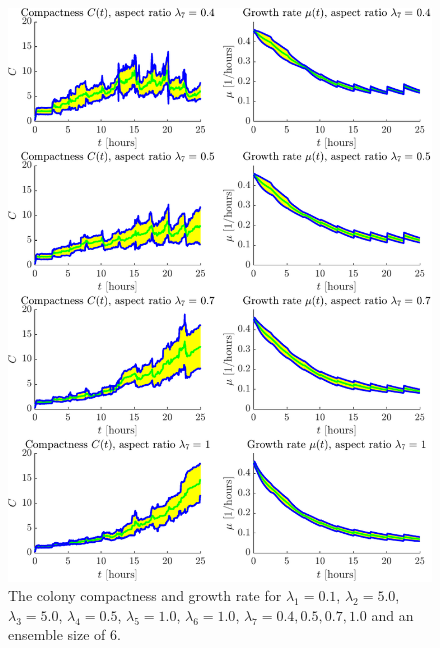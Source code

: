 \begin{figure}[!htb]
    \centering
    \includegraphics[width= \textwidth]{
        chapter4/figures/Comp_all_ar_EnsembleSize_6o0_L1_0o10_L2_5o00_L3_5o00_L4_0o50_L5_1o00_L6_1o00_L7_0o40.pdf}
    \caption{The colony compactness and growth rate for 
             $\lambda_1 = 0.1$,  
             $\lambda_2 = 5.0$, 
             $\lambda_3 = 5.0$, 
             $\lambda_4 = 0.5$, 
             $\lambda_5 = 1.0$, 
             $\lambda_6 = 1.0$, 
             $\lambda_7 = 0.4, 0.5, 0.7, 1.0$ and an ensemble size of $6$.}
    \label{fig:compactnessAndMu_varyAR}
\end{figure}

